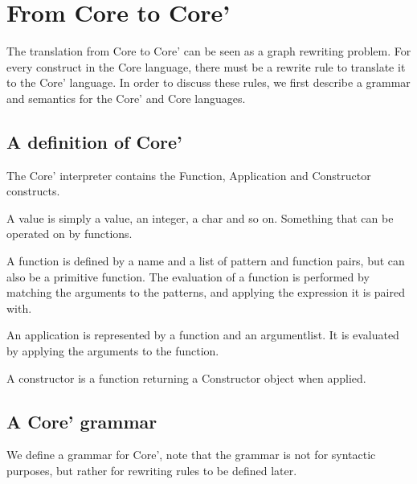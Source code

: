 



\chapter{From Core to Core'}

The translation from Core to Core' can be seen as a graph rewriting problem. For
every construct in the Core language, there must be a rewrite rule to translate it
to the Core' language. In order to discuss these rules, we first describe a grammar
and semantics for the Core' and Core languages.

\section*{A definition of Core'}

The Core' interpreter contains the Function, Application and Constructor constructs.

A value is simply a value, an integer, a char and so on. Something that can be
operated on by functions.

A function is defined by a name and a list of pattern and function pairs,
but can also be a primitive function.
The evaluation of a function is performed by matching the arguments to
the patterns, and applying the expression it is paired with.

An application is represented by a function and an argumentlist. It is
evaluated by applying the arguments to the function.

A constructor is a function returning a Constructor object when applied. 

\section*{A Core' grammar}

We define a grammar for Core', note that the grammar is not for syntactic
purposes, but rather for rewriting rules to be defined later.

